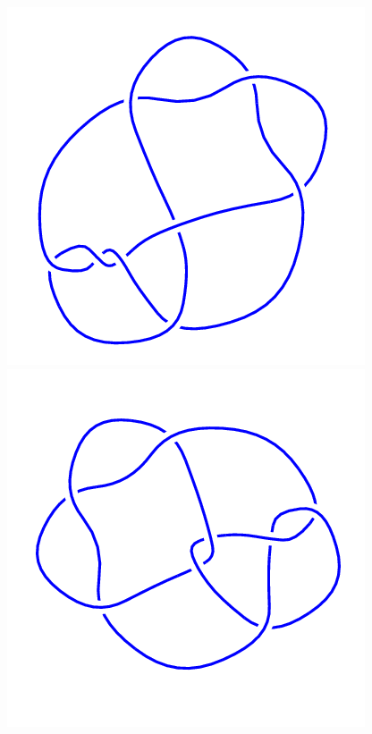 \begin{figure}[H]
\begin{minipage}[b]{.18\linewidth}
	\end{minipage}
	\begin{minipage}[b]{.18\linewidth}
		\centering
		\includegraphics[width=\linewidth]{../data/8_9.png}
	\end{minipage}
	\begin{minipage}[b]{.18\linewidth}
		\centering
		\includegraphics[width=\linewidth]{../data/8_10.png}

\end{minipage}
\end{figure}
